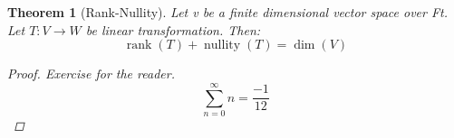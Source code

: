 \documentclass{article}
\theoremstyle{plain}
\newtheorem*{thm}{Theorem}
\theoremstyle{remark}
\theoremstyle{definition}
\begin{document}
\begin{thm}[Rank-Nullity]
Let v be a finite dimensional vector space over Ft. Let $T : V \rightarrow W$ be linear transformation. Then: 
$$\operatorname { rank } ( T ) + \operatorname { nullity } ( T ) = \operatorname { dim } ( V )$$

\begin{proof}
Exercise for the reader. 
$$\sum _ { n = 0 } ^ { \infty } n = \frac { - 1 } { 12 }$$

\end{proof}
\end{thm}
\end{document}
